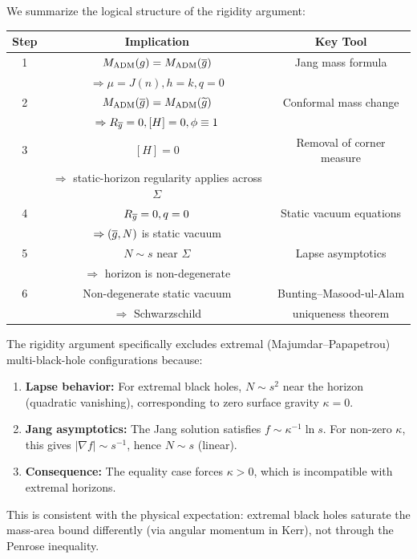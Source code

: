 We summarize the logical structure of the rigidity argument:

\begin{center}
\begin{tabular}{|c|c|c|}
\hline
\textbf{Step} & \textbf{Implication} & \textbf{Key Tool} \\
\hline
1 & $M_{\mathrm{ADM}}(g) = M_{\mathrm{ADM}}(\overline{g})$ & Jang mass formula \\
  & $\Rightarrow \mu = J(n), h = k, q = 0$ & \\
\hline
2 & $M_{\mathrm{ADM}}(\overline{g}) = M_{\mathrm{ADM}}(\widetilde{g})$ & Conformal mass change \\
  & $\Rightarrow R_{\overline{g}} = 0, [H] = 0, \phi \equiv 1$ & \\
\hline
3 & $[H] = 0$ & Removal of corner measure \\
  & $\Rightarrow$ static-horizon regularity applies across $\Sigma$ & \\
\hline
4 & $R_{\overline{g}} = 0, q = 0$ & Static vacuum equations \\
  & $\Rightarrow (\overline{g}, N)$ is static vacuum & \\
\hline
5 & $N \sim s$ near $\Sigma$ & Lapse asymptotics \\
  & $\Rightarrow$ horizon is non-degenerate & \\
\hline
6 & Non-degenerate static vacuum & Bunting--Masood-ul-Alam \\
  & $\Rightarrow$ Schwarzschild & uniqueness theorem \\
\hline
\end{tabular}
\end{center}

\begin{remark}
The rigidity argument specifically excludes extremal (Majumdar--Papapetrou) multi-black-hole configurations because:
\begin{enumerate}
    \item \textbf{Lapse behavior:} For extremal black holes, $N \sim s^2$ near the horizon (quadratic vanishing), corresponding to zero surface gravity $\kappa = 0$.
    \item \textbf{Jang asymptotics:} The Jang solution satisfies $f \sim \kappa^{-1} \ln s$. For non-zero $\kappa$, this gives $|\nabla f| \sim s^{-1}$, hence $N \sim s$ (linear).
    \item \textbf{Consequence:} The equality case forces $\kappa > 0$, which is incompatible with extremal horizons.
\end{enumerate}
This is consistent with the physical expectation: extremal black holes saturate the mass-area bound differently (via angular momentum in Kerr), not through the Penrose inequality.
\end{remark}

